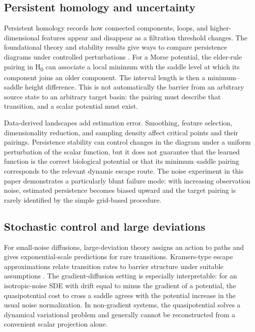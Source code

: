 \documentclass[11pt]{article}
\newcommand{\1}{\mathbf{1}}
\begin{document}
\subsection{Persistent homology and uncertainty}
Persistent homology records how connected components, loops, and higher-dimensional features appear and disappear as a filtration threshold changes. The foundational theory and stability results give ways to compare persistence diagrams under controlled perturbations \citep{edelsbrunner2002persistence,cohensteiner2007stability}. For a Morse potential, the elder-rule pairing in H\textsubscript{0} can associate a local minimum with the saddle level at which its component joins an older component. The interval length is then a minimum--saddle height difference. This is not automatically the barrier from an arbitrary source state to an arbitrary target basin: the pairing must describe that transition, and a scalar potential must exist.

Data-derived landscapes add estimation error. Smoothing, feature selection, dimensionality reduction, and sampling density affect critical points and their pairings. Persistence stability can control changes in the diagram under a uniform perturbation of the scalar function, but it does not guarantee that the learned function is the correct biological potential or that its minimum--saddle pairing corresponds to the relevant dynamic escape route. The noise experiment in this paper demonstrates a particularly blunt failure mode: with increasing observation noise, estimated persistence becomes biased upward and the target pairing is rarely identified by the simple grid-based procedure.

\subsection{Stochastic control and large deviations}
For small-noise diffusions, large-deviation theory assigns an action to paths and gives exponential-scale predictions for rare transitions. Kramers-type escape approximations relate transition rates to barrier structure under suitable assumptions \citep{kramers1940brownian,freidlin2012random}. The gradient-diffusion setting is especially interpretable: for an isotropic-noise SDE with drift equal to minus the gradient of a potential, the quasipotential cost to cross a saddle agrees with the potential increase in the usual noise normalization. In non-gradient systems, the quasipotential solves a dynamical variational problem and generally cannot be reconstructed from a convenient scalar projection alone.
\end{document}
